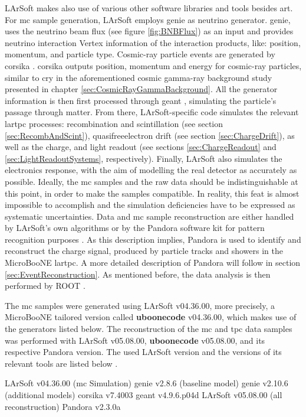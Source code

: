 \Gls{LArSoft} makes also use of various other software libraries and tools besides \gls{art}. For \gls{mc} sample generation, \gls{LArSoft} employs \gls{genie} \cite{GenieGenerator,GenieTools} as neutrino generator. \Gls{genie}, uses the neutrino beam flux (see figure \ref{fig:BNBFlux}) as an input and provides neutrino interaction \gls{Vertex} information of the interaction products, like: position, momentum, and particle type. Cosmic-ray particle events are generated by \gls{corsika} \cite{CorsikaWeb,Corsika}. \Gls{corsika} outputs position, momentum and energy for cosmic-ray particles, similar to \gls{cry} in the aforementioned cosmic gamma-ray background study presented in chapter \ref{sec:CosmicRayGammaBackground}. All the generator information is then first processed through \gls{geant} \cite{MCSimulationGeant4}, simulating the particle's passage through matter. From there, \gls{LArSoft}-specific code simulates the relevant \gls{lartpc} processes: recombination and scintillation (see section \ref{sec:RecombAndScint}), \gls{quasifreeelectron} drift (see section \ref{sec:ChargeDrift}), as well as the charge, and light readout (see sections \ref{sec:ChargeReadout} and \ref{sec:LightReadoutSystems}, respectively). Finally, \gls{LArSoft} also simulates the electronics response, with the aim of modelling the real detector as accurately as possible. Ideally, the \gls{mc} samples and the raw data should be indistinguishable at this point, in order to make the samples compatible. In reality, this feat is almost impossible to accomplish and the simulation deficiencies have to be expressed as systematic uncertainties. Data and \gls{mc} sample reconstruction are either handled by \gls{LArSoft}'s own algorithms or by the \gls{Pandora} software kit for pattern recognition purposes \cite{Pandora,PandoraLAr}. As this description implies, \gls{Pandora} is used to identify and reconstruct the charge signal, produced by particle tracks and showers in the MicroBooNE \gls{lartpc}. A more detailed description of \gls{Pandora} will follow in section \ref{sec:EventReconstruction}. As mentioned before, the data analysis is then performed by ROOT \cite{ROOT}.

The \gls{mc} samples were generated using \gls{LArSoft} v04.36.00, more precisely, a MicroBooNE tailored version called \textbf{uboonecode} v04.36.00, which makes use of the generators listed below. The reconstruction of the \gls{mc} and \gls{tpc} data samples was performed with \gls{LArSoft} v05.08.00, \ie \textbf{uboonecode} v05.08.00, and its respective \gls{Pandora} version. The used \gls{LArSoft} version and the versions of its relevant tools are listed below \cite{MicroBooNECCInclPN}.
\begin{outline}
    \1 \gls{LArSoft} v04.36.00 (\gls{mc} Simulation)
        \2 \gls{genie} v2.8.6 (baseline model)
        \2 \gls{genie} v2.10.6 (additional models)
        \2 \gls{corsika} v7.4003
        \2 \gls{geant} v4.9.6.p04d
    \1 \gls{LArSoft} v05.08.00 (all reconstruction)
        \2 \gls{Pandora} v2.3.0a
\end{outline}

